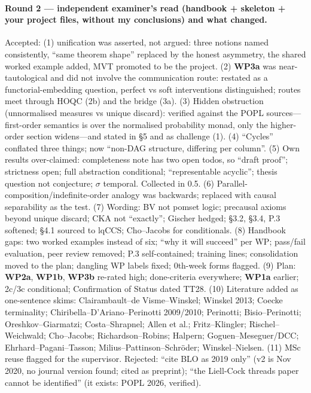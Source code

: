 \documentclass[11pt,a4paper]{article}
\newcommand{\WP}[1]{\textbf{WP#1}}
\begin{document}
\paragraph{Round 2 --- independent examiner's read (handbook + skeleton + your project files, without my conclusions) and what changed.}
Accepted: (1) unification was asserted, not argued: three notions named consistently, ``same theorem shape'' replaced by the honest asymmetry, the shared worked example added, MVT promoted to be the project. (2) \WP{3a} was near-tautological and did not involve the communication route: restated as a functorial-embedding question, perfect vs soft interventions distinguished; routes meet through HOQC (2b) and the bridge (3a). (3) Hidden obstruction (unnormalised measures vs unique discard): verified against the POPL sources---first-order semantics is over the normalised probability monad, only the higher-order section widens---and stated in \S5 and as challenge (1). (4) ``Cycles'' conflated three things; now ``non-DAG structure, differing per column''. (5) Own results over-claimed: completeness note has two open todos, so ``draft proof''; strictness open; full abstraction conditional; ``representable acyclic''; thesis question not conjecture; $\sigma$ temporal. Collected in 0.5. (6) Parallel-composition/indefinite-order analogy was backwards; replaced with causal separability as the test. (7) Wording: BV not pomset logic; precausal axioms beyond unique discard; CKA not ``exactly''; Gischer hedged; \S3.2, \S3.4, P.3 softened; \S4.1 sourced to lqCCS; Cho--Jacobs for conditionals. (8) Handbook gaps: two worked examples instead of six; ``why it will succeed'' per WP; pass/fail evaluation, peer review removed; P.3 self-contained; training lines; consolidation moved to the plan; dangling WP labels fixed; 0th-week forms flagged. (9) Plan: \WP{2a}, \WP{1b}, \WP{3b} re-rated high; done-criteria everywhere; \WP{1a} earlier; 2c/3c conditional; Confirmation of Status dated TT28. (10) Literature added as one-sentence skims: Clairambault--de Visme--Winskel; Winskel 2013; Coecke terminality; Chiribella--D'Ariano--Perinotti 2009/2010; Perinotti; Bisio--Perinotti; Oreshkov--Giarmatzi; Costa--Shrapnel; Allen et al.; Fritz--Klingler; Rischel--Weichwald; Cho--Jacobs; Richardson--Robins; Halpern; Goguen--Meseguer/DCC; Ehrhard--Pagani--Tasson; Milius--Pattinson--Schr\"oder; Winskel--Nielsen. (11) MSc reuse flagged for the supervisor.
Rejected: ``cite BLO as 2019 only'' (v2 is Nov 2020, no journal version found; cited as preprint); ``the Liell-Cock threads paper cannot be identified'' (it exists: POPL 2026, verified).
\end{document}
